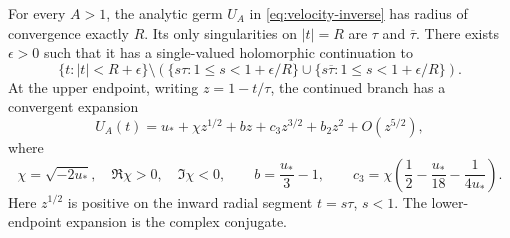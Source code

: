 \begin{theorem}
\label{thm:selected-sheet}
For every $A>1$, the analytic germ $U_A$ in
\eqref{eq:velocity-inverse} has radius of convergence exactly $R$.
Its only singularities on $|t|=R$ are $\tau$ and $\overline\tau$.
There exists $\epsilon>0$ such that it has a single-valued holomorphic
continuation to
\begin{equation}\label{eq:slit-domain}
 \{t:|t|<R+\epsilon\}\setminus
 \left(\{s\tau:1\leq s<1+\epsilon/R\}
       \cup\{s\overline\tau:1\leq s<1+\epsilon/R\}\right).
\end{equation}
At the upper endpoint, writing $z=1-t/\tau$, the continued branch has a
convergent expansion
\begin{equation}\label{eq:selected-puiseux}
 U_A(t)=u_*+\chi z^{1/2}+b z+c_3z^{3/2}+b_2z^2+O(z^{5/2}),
\end{equation}
where
\begin{equation}\label{eq:puiseux-first-coefficients}
 \chi=\sqrt{-2u_*},\quad\Re\chi>0,\quad\Im\chi<0,
 \qquad b=\frac{u_*}{3}-1,
 \qquad c_3=\chi\left(\frac12-\frac{u_*}{18}-\frac1{4u_*}\right).
\end{equation}
Here $z^{1/2}$ is positive on the inward radial segment $t=s\tau$,
$s<1$.  The lower-endpoint expansion is the complex conjugate.
\end{theorem}

